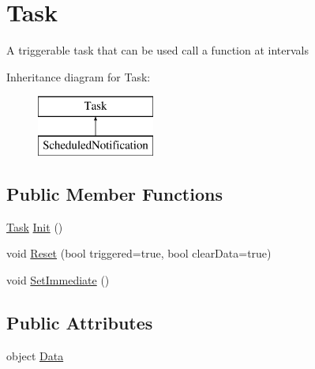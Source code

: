 \hypertarget{classOTA_1_1Misc_1_1Task}{}\section{Task}
\label{classOTA_1_1Misc_1_1Task}


A triggerable task that can be used call a function at intervals  


Inheritance diagram for Task\+:\begin{figure}[H]
\begin{center}
\leavevmode
\includegraphics[height=2.000000cm]{classOTA_1_1Misc_1_1Task}
\end{center}
\end{figure}
\subsection*{Public Member Functions}
\begin{DoxyCompactItemize}
\item 
\hyperlink{classOTA_1_1Misc_1_1Task}{Task} \hyperlink{classOTA_1_1Misc_1_1Task_a0ae96a321c0a4fe97d1ae8a159ebbed5}{Init} ()
\item 
void \hyperlink{classOTA_1_1Misc_1_1Task_a212a5316fd33a11affc1b8d42566979a}{Reset} (bool triggered=true, bool clear\+Data=true)
\item 
void \hyperlink{classOTA_1_1Misc_1_1Task_ae8e28a99546ac2bd25404287d4dbe741}{Set\+Immediate} ()
\end{DoxyCompactItemize}
\subsection*{Public Attributes}
\begin{DoxyCompactItemize}
\item 
object \hyperlink{classOTA_1_1Misc_1_1Task_a248bfced8a2a84c147f9b20efe3e669a}{Data}
\end{DoxyCompactItemize}
